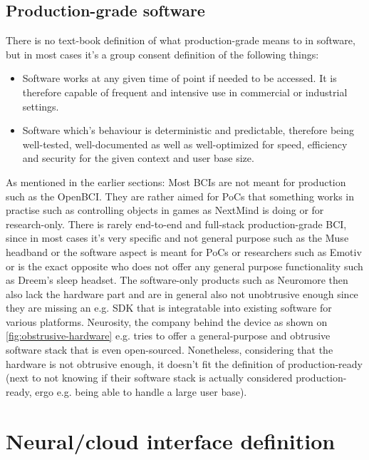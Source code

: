 \subsection{Production-grade software}
\label{chapter2-production-grade-software}

There is no text-book definition of what production-grade means to in software, but in most cases it's a group consent definition of the following things:

\begin{itemize}
  \item Software works at any given time of point if needed to be accessed. It is therefore capable of frequent and intensive use in commercial or industrial settings.
  \item Software which's behaviour is deterministic and predictable, therefore being well-tested, well-documented as well as well-optimized for speed, efficiency and security for the given context and user base size.
\end{itemize}

As mentioned in the earlier sections: Most BCIs are not meant for production such as the OpenBCI. They are rather aimed for PoCs that something works in practise such as controlling objects in games as NextMind is doing or for research-only. There is rarely end-to-end and full-stack production-grade BCI, since in most cases it's very specific and not general purpose such as the Muse headband or the software aspect is meant for PoCs or researchers such as Emotiv or is the exact opposite who does not offer any general purpose functionality such as Dreem's sleep headset. The software-only products such as Neuromore then also lack the hardware part and are in general also not unobtrusive enough since they are missing an e.g. SDK that is integratable into existing software for various platforms. Neurosity, the company behind the device as shown on \autoref{fig:obstrusive-hardware} e.g. tries to offer a general-purpose and obtrusive software stack that is even open-sourced. Nonetheless, considering that the hardware is not obtrusive enough, it doesn't fit the definition of production-ready (next to not knowing if their software stack is actually considered production-ready, ergo e.g. being able to handle a large user base).

\section{Neural/cloud interface definition}
\label{chapter2-neural-cloud-interface-definition}

